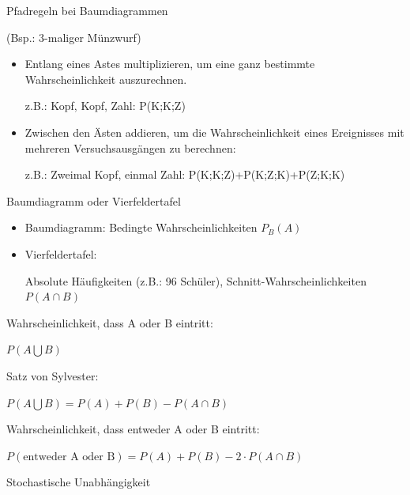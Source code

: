 \documentclass[paper=a6,landscape,ngerman,twoside=true,fontsize=12pt]{scrartcl}
\begin{document}
\begin{frage}
	Pfadregeln bei Baumdiagrammen
	
	(Bsp.: 3-maliger Münzwurf)
\end{frage}
\begin{antwort}
	\normalsize\begin{itemize}
		\item Entlang eines Astes multiplizieren, um eine ganz bestimmte Wahrscheinlichkeit auszurechnen.
				
		z.B.: Kopf, Kopf, Zahl: P(K;K;Z)
		\item Zwischen den Ästen addieren, um die Wahrscheinlichkeit eines Ereignisses mit mehreren Versuchsausgängen zu berechnen:
		
		z.B.: Zweimal Kopf, einmal Zahl: P(K;K;Z)+P(K;Z;K)+P(Z;K;K)
	\end{itemize}
\end{antwort}
\begin{frage}
	Baumdiagramm oder Vierfeldertafel
\end{frage}
\begin{antwort}
	\begin{itemize}
		\item Baumdiagramm: Bedingte Wahrscheinlichkeiten $P_B(A)$
		
		\item Vierfeldertafel: 
		
		Absolute Häufigkeiten (z.B.: 96 Schüler), Schnitt-Wahrscheinlichkeiten $P(A\cap B)$
	\end{itemize}
\end{antwort}
\begin{frage}
	Wahrscheinlichkeit, dass A oder B eintritt: 
	
	$P(A\bigcup B)$
\end{frage}
\begin{antwort}
	Satz von Sylvester:
	
	$P(A\bigcup B)=P(A)+P(B)- P(A\cap B)$
\end{antwort}
\begin{frage}
	Wahrscheinlichkeit, dass entweder A oder B eintritt: 
	
\end{frage}
\begin{antwort}
	$P(\text{entweder A oder B})=P(A)+P(B)- 2 \cdot P(A\cap B)$
\end{antwort}
\begin{frage}
	Stochastische Unabhängigkeit 
	
\end{frage}
\end{document}
